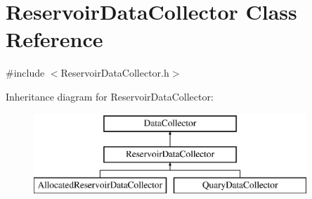 \hypertarget{classReservoirDataCollector}{}\section{Reservoir\+Data\+Collector Class Reference}
\label{classReservoirDataCollector}


{\ttfamily \#include $<$Reservoir\+Data\+Collector.\+h$>$}

Inheritance diagram for Reservoir\+Data\+Collector\+:\begin{figure}[H]
\begin{center}
\leavevmode
\includegraphics[height=3.000000cm]{classReservoirDataCollector}
\end{center}
\end{figure}

